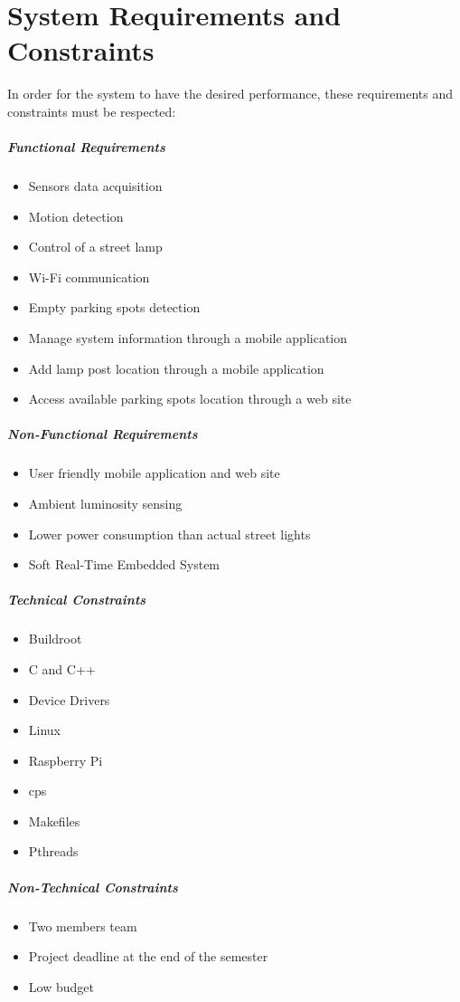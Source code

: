 \section{System Requirements and Constraints}
In order for the system to have the desired performance, these requirements and constraints must be respected:

\subparagraph{Functional Requirements}
\begin{itemize}
	\item Sensors data acquisition				
	\item Motion detection
	\item Control of a street lamp
	\item Wi-Fi communication
	\item Empty parking spots detection
	\item Manage system information through a mobile application
	\item Add lamp post location through a mobile application
	\item Access available parking spots location through a web site
\end{itemize}

\subparagraph{Non-Functional Requirements}
\begin{itemize}
	\item User friendly mobile application and web site
	\item Ambient luminosity sensing
	\item Lower power consumption than actual street lights
	\item Soft Real-Time Embedded System
\end{itemize}

\subparagraph{Technical Constraints}
\begin{itemize}
	\item Buildroot
	\item C and C++ 
	\item Device Drivers
	\item Linux
	\item Raspberry Pi
	\item \ac{cps}
	\item Makefiles
	\item Pthreads
\end{itemize}

\subparagraph{Non-Technical Constraints}
\begin{itemize}
	\item Two members team
	\item Project deadline at the end of the semester
	\item Low budget
\end{itemize}

